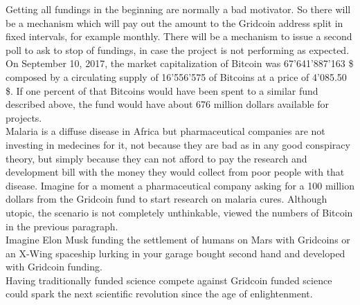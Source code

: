 Getting all fundings in the beginning are normally a bad motivator. So there will be a mechanism which will pay out the amount to the Gridcoin address split in fixed intervals, for example monthly. There will be a mechanism to issue a second poll to ask to stop of fundings, in case the project is not performing as expected.\\

On September 10, 2017, the market capitalization of Bitcoin was 67'641'887'163 \$ composed by a circulating supply of 16'556'575 of Bitcoins at a price of 4'085.50 \$. If one percent of that Bitcoins would have been spent to a similar fund described above, the fund would have about 676 million dollars available for projects.\\

Malaria is a diffuse disease in Africa but pharmaceutical companies are not investing in medecines for it, not because they are bad as in any good conspiracy theory, but simply because they can not afford to pay the research and development bill with the money they would collect from poor people with that disease. Imagine for a moment a pharmaceutical company asking for a 100 million dollars from the Gridcoin fund to start research on malaria cures. Although utopic, the scenario is not completely unthinkable, viewed the numbers of Bitcoin in the previous paragraph.\\

Imagine Elon Musk funding the settlement of humans on Mars with Gridcoins or an X-Wing spaceship lurking in your garage bought second hand and developed with Gridcoin funding.\\

Having traditionally funded science compete against Gridcoin funded science could spark the next scientific revolution since the age of enlightenment.\\
